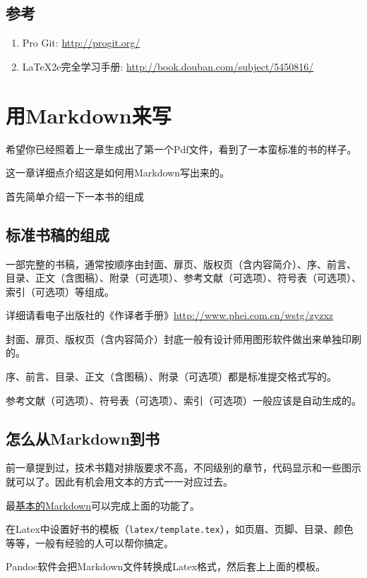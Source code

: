 \documentclass[a4paper]{book}
\newcommand{\chap}[1]{\newpage\thispagestyle{empty}\chapter{#1}\label{chap:\thechapter}}
\begin{document}
\section{参考}

\begin{enumerate}\setlength{\itemsep}{1pt}\setlength{\parskip}{0pt}\setlength{\parsep}{0pt}
\item
  Pro Git: \url{http://progit.org/}
\item
  LaTeX2e完全学习手册: \url{http://book.douban.com/subject/5450816/}
\end{enumerate}
\chap{用Markdown来写}

希望你已经照着上一章生成出了第一个Pdf文件，看到了一本蛮标准的书的样子。

这一章详细点介绍这是如何用Markdown写出来的。

首先简单介绍一下一本书的组成

\section{标准书稿的组成}

一部完整的书稿，通常按顺序由封面、扉页、版权页（含内容简介）、序、前言、目录、正文（含图稿）、附录（可选项）、参考文献（可选项）、符号表（可选项）、索引（可选项）等组成。

详细请看电子出版社的《作译者手册》\url{http://www.phei.com.cn/wstg/zyzxz}

封面、扉页、版权页（含内容简介）封底一般有设计师用图形软件做出来单独印刷的。

序、前言、目录、正文（含图稿）、附录（可选项）都是标准提交格式写的。

参考文献（可选项）、符号表（可选项）、索引（可选项）一般应该是自动生成的。

\section{怎么从Markdown到书}

前一章提到过，技术书籍对排版要求不高，不同级别的章节，代码显示和一些图示就可以了。因此有机会用文本的方式一一对应过去。

最\href{http://daringfireball.net/projects/markdown/}{基本的Markdown}可以完成上面的功能了。

在Latex中设置好书的模板（{\texttt{latex/template.tex}}），如页眉、页脚、目录、颜色等等，一般有经验的人可以帮你搞定。

Pandoc软件会把Markdown文件转换成Latex格式，然后套上上面的模板。
\end{document}
